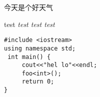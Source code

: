 \documentclass[12pt,hyperref,UTF8]{ctexbook}
\begin{document}
今天是个好天气

{
test \itshape test \ttfamily test \upshape test
}

{
 
\lstset{language=C++,
basicstyle=\footnotesize\ttfamily,
showstringspaces=true
} 
\begin{lstlisting} 
#include <iostream> 
using namespace std;
 int main() { 
     cout<<"hel lo"<<endl;
     foo<int>();
     return 0;
} 
\end{lstlisting}
 
}
\end{document}
